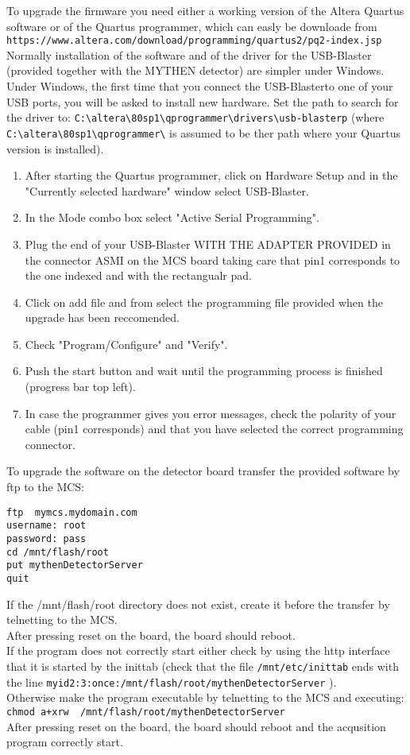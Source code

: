 \documentclass{report}
\begin{document}
To upgrade the firmware you need either a working version of the Altera Quartus software or of the Quartus programmer, which can easly be downloade from \\
\verb=https://www.altera.com/download/programming/quartus2/pq2-index.jsp= \\
Normally installation of the software and of the driver for the USB-Blaster (provided together with the MYTHEN detector) are simpler under Windows.\\
Under Windows, the first time that you connect the USB-Blasterto one of your USB ports, you will be asked to install new hardware. Set the path to search
for the driver to: \verb=C:\altera\80sp1\qprogrammer\drivers\usb-blasterp= (where  \verb=C:\altera\80sp1\qprogrammer\= is assumed to be ther path where your Quartus version is installed).\\
\begin{enumerate}
\item After starting the Quartus programmer, click on Hardware Setup and in the "Currently selected hardware" window select USB-Blaster.
\item In the Mode combo box select "Active Serial Programming".
\item Plug the end of your USB-Blaster WITH THE ADAPTER PROVIDED in the connector ASMI on the MCS board taking care that pin1 corresponds to the one indexed and with the rectangualr pad.
\item Click on add file and from select the programming file provided when the upgrade has been reccomended.
\item Check "Program/Configure" and "Verify".
\item Push the start button and wait until the programming process is finished (progress bar top left).
\item In case the programmer gives you error messages, check the polarity of your cable (pin1 corresponds) and that you have selected the correct programming connector.
\end{enumerate}

To upgrade the software on the detector board transfer the provided software by ftp to the MCS:
\begin{verbatim}
ftp  mymcs.mydomain.com
username: root
password: pass
cd /mnt/flash/root
put mythenDetectorServer
quit
\end{verbatim}
If the  /mnt/flash/root directory does not exist, create it before the transfer by telnetting to the MCS.\\
After pressing reset on the board, the board should reboot.\\
If the program does not correctly start either check by using the http interface that it is started by the inittab (check that the file \verb=/mnt/etc/inittab= ends with the line \verb=myid2:3:once:/mnt/flash/root/mythenDetectorServer= ). \\
Otherwise make the program executable by telnetting to the MCS and executing:
\verb=chmod a+xrw  /mnt/flash/root/mythenDetectorServer=\\
After pressing reset on the board, the board should reboot and the acqusition program correctly start.
\end{document}
